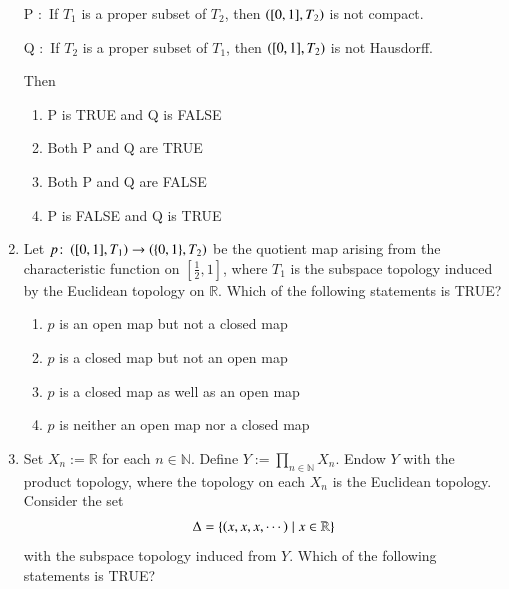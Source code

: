 \documentclass[journal,12pt,onecolumn]{IEEEtran}
\theoremstyle{remark}
\begin{document}
\begin{enumerate}
P $\colon$ If $T_{1}$ is a proper subset of $T_{2}$, then $\left([0,1], T_{2}\right)$ is not compact.

Q $\colon$ If $T_{2}$ is a proper subset of $T_{1}$, then $\left([0,1], T_{2}\right)$ is not Hausdorff.

Then

\hfill{}

\begin{enumerate}
\item P is TRUE and Q is FALSE
\item Both P and Q are TRUE
\item Both P and Q are FALSE
\item P is FALSE and Q is TRUE
\end{enumerate}

\item Let $p \colon \left([0,1], T_{1}\right) \to \left(\{0,1\}, T_{2}\right)$ be the quotient map arising from the characteristic function on $\left[\tfrac{1}{2}, 1\right]$, where $T_{1}$ is the subspace topology induced by the Euclidean topology on $\mathbb{R}$. Which of the following statements is TRUE?

\hfill{}

\begin{enumerate}
\item $p$ is an open map but not a closed map
\item $p$ is a closed map but not an open map
\item $p$ is a closed map as well as an open map
\item $p$ is neither an open map nor a closed map
\end{enumerate}

\item Set $X_{n} := \mathbb{R}$ for each $n \in \mathbb{N}$. Define $Y := \displaystyle\prod_{n\in\mathbb{N}} X_{n}$. Endow $Y$ with the product topology, where the topology on each $X_{n}$ is the Euclidean topology. Consider the set
\begin{align*}
\Delta = \left\{\left(x, x, x, \cdots\right) \mid x \in \mathbb{R}\right\}
\end{align*}
with the subspace topology induced from $Y$. Which of the following statements is TRUE?

\hfill{}

\begin{enumerate}
\end{enumerate}
\end{enumerate}
\end{document}

